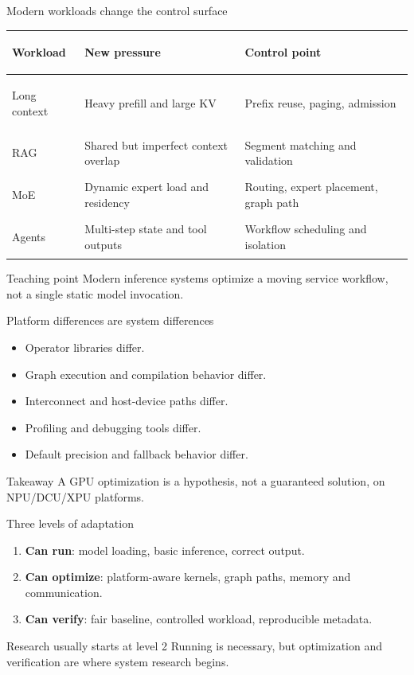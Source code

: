 \documentclass[aspectratio=169,11pt]{beamer}
\newcommand{\term}[1]{\textcolor{HUSTBlue}{\textbf{#1}}}
\begin{document}
\begin{frame}{Modern workloads change the control surface}
  \begin{tabularx}{\textwidth}{>{\bfseries\raggedright\arraybackslash}p{2.2cm}YY}
    \toprule
    Workload & New pressure & Control point \\
    \midrule
    Long context & Heavy prefill and large KV & Prefix reuse, paging, admission \\
    RAG & Shared but imperfect context overlap & Segment matching and validation \\
    MoE & Dynamic expert load and residency & Routing, expert placement, graph path \\
    Agents & Multi-step state and tool outputs & Workflow scheduling and isolation \\
    \bottomrule
  \end{tabularx}
  \vspace{0.28cm}
  \begin{block}{Teaching point}
    Modern inference systems optimize a moving service workflow, not a single static model invocation.
  \end{block}
\end{frame}

\begin{frame}{Platform differences are system differences}
  \begin{itemize}
    \item Operator libraries differ.
    \item Graph execution and compilation behavior differ.
    \item Interconnect and host-device paths differ.
    \item Profiling and debugging tools differ.
    \item Default precision and fallback behavior differ.
  \end{itemize}
  \vspace{0.32cm}
  \begin{block}{Takeaway}
    A GPU optimization is a hypothesis, not a guaranteed solution, on NPU/DCU/XPU platforms.
  \end{block}
\end{frame}

\begin{frame}{Three levels of adaptation}
  \begin{enumerate}
    \item \term{Can run}: model loading, basic inference, correct output.
    \item \term{Can optimize}: platform-aware kernels, graph paths, memory and communication.
    \item \term{Can verify}: fair baseline, controlled workload, reproducible metadata.
  \end{enumerate}
  \vspace{0.35cm}
  \begin{block}{Research usually starts at level 2}
    Running is necessary, but optimization and verification are where system research begins.
  \end{block}
\end{frame}
\end{document}
